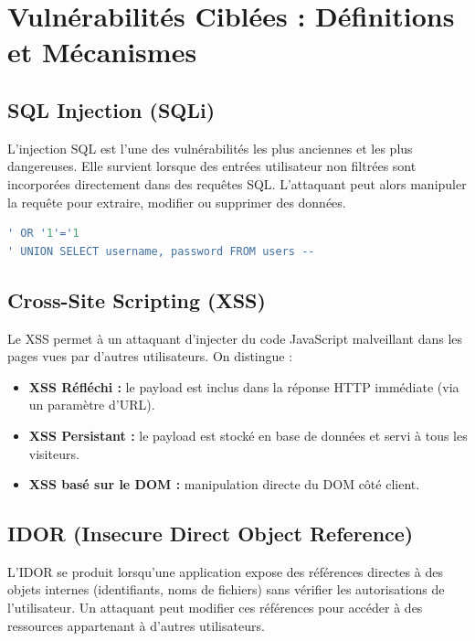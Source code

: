 \documentclass[12pt, a4paper]{report}
\begin{document}
\section{Vulnérabilités Ciblées : Définitions et Mécanismes}

\subsection{SQL Injection (SQLi)}

L'injection SQL est l'une des vulnérabilités les plus anciennes et les plus
dangereuses. Elle survient lorsque des entrées utilisateur non filtrées sont
incorporées directement dans des requêtes SQL. L'attaquant peut alors manipuler
la requête pour extraire, modifier ou supprimer des données.

\begin{lstlisting}[language=SQL, caption={Exemple de payload SQLi classique}]
' OR '1'='1
' UNION SELECT username, password FROM users --
\end{lstlisting}

\subsection{Cross-Site Scripting (XSS)}

Le XSS permet à un attaquant d'injecter du code JavaScript malveillant dans
les pages vues par d'autres utilisateurs. On distingue :
\begin{itemize}[leftmargin=2em, itemsep=2pt]
  \item \textbf{XSS Réfléchi :} le payload est inclus dans la réponse HTTP
        immédiate (via un paramètre d'URL).
  \item \textbf{XSS Persistant :} le payload est stocké en base de données
        et servi à tous les visiteurs.
  \item \textbf{XSS basé sur le DOM :} manipulation directe du DOM côté client.
\end{itemize}

\subsection{IDOR (Insecure Direct Object Reference)}

L'IDOR se produit lorsqu'une application expose des références directes à des
objets internes (identifiants, noms de fichiers) sans vérifier les autorisations
de l'utilisateur. Un attaquant peut modifier ces références pour accéder à des
ressources appartenant à d'autres utilisateurs.
\end{document}
